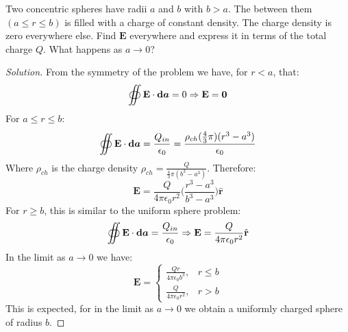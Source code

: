             \begin{problem}[Wangsness 4-6]
                Two concentric spheres have radii $a$ and $b$ with $b>a$.
                The between them $(a\leq{r}\leq{b})$ is filled with a
                charge of constant density. The charge density is zero
                everywhere else. Find $\mathbf{E}$ everywhere and express
                it in terms of the total charge $Q$.
                What happens as $a\rightarrow{0}$?
            \end{problem}
            \begin{proof}[Solution]
                From the symmetry of the problem we have, for $r<a$, that:
                \begin{equation*}
                    \oiint\mathbf{E}\cdot\boldsymbol{\mathop{}\!\mathrm{d}{a}}
                    =0\Rightarrow\mathbf{E}=\mathbf{0}
                \end{equation*}
                For $a\leq{r}\leq{b}$:
                \begin{equation*}
                    \oiint\mathbf{E}\cdot\boldsymbol{\mathop{}\!\mathrm{d}{a}}
                    =\frac{Q_{in}}{\epsilon_{0}}
                    =\frac{\rho_{ch}(\frac{4}{3}\pi)(r^{3}-a^{3})}
                          {\epsilon_0}    
                \end{equation*}
                Where $\rho_{ch}$ is the charge density
                $\rho_{ch}=\frac{Q}{\frac{4}{3}\pi(b^{3}-a^{3})}$.
                Therefore:
                \begin{equation*}
                    \mathbf{E}
                    =\frac{Q}{4\pi\epsilon_{0}r^{2}}
                    \bigg(\frac{r^{3}-a^{3}}{b^{3}-a^{3}}\bigg)
                    \hat{\mathbf{r}}
                \end{equation*}
                For $r\geq b$, this is similar to
                the uniform sphere problem:
                \begin{equation*}
                    \oiint\mathbf{E}\cdot\boldsymbol{\mathop{}\!\mathrm{d}{a}}
                    =\frac{Q_{in}}{\epsilon_{0}}
                    \Rightarrow\mathbf{E}
                    =\frac{Q}{4\pi\epsilon_{0}r^{2}}\hat{\mathbf{r}}
                \end{equation*}
                In the limit as $a\rightarrow{0}$ we have:
                \begin{equation*}
                    \mathbf{E}=
                    \begin{cases}
                        \frac{Qr}{4\pi\epsilon_{0}b^{3}},&r\leq b\\
                        \frac{Q}{4\pi\epsilon_{0}r^{2}},&r>b
                    \end{cases}
                \end{equation*}
                This is expected, for in the limit as
                $a\rightarrow 0$ we obtain a uniformly
                charged sphere of radius $b$.
            \end{proof}
